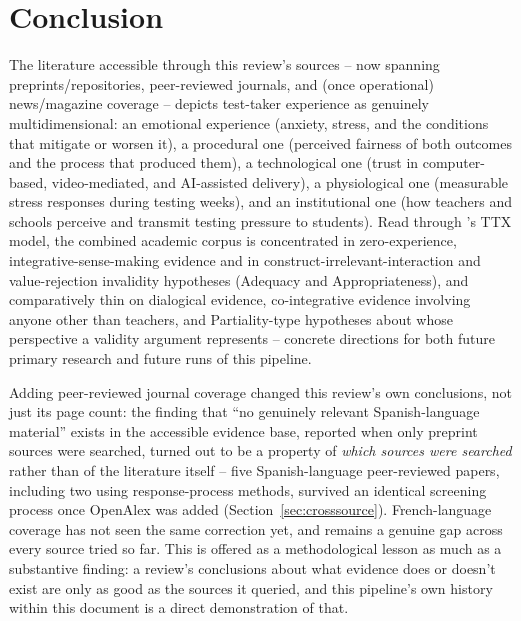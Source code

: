 \documentclass[11pt]{article}
\begin{document}
\section{Conclusion}

The literature accessible through this review's sources -- now spanning preprints/repositories, peer-reviewed journals, and (once operational) news/magazine coverage -- depicts test-taker experience as genuinely multidimensional: an emotional experience (anxiety, stress, and the conditions that mitigate or worsen it), a procedural one (perceived fairness of both outcomes and the process that produced them), a technological one (trust in computer-based, video-mediated, and AI-assisted delivery), a physiological one (measurable stress responses during testing weeks), and an institutional one (how teachers and schools perceive and transmit testing pressure to students). Read through \citeauthor{araneda2025ttxmodel}'s TTX model, the combined academic corpus is concentrated in zero-experience, integrative-sense-making evidence and in construct-irrelevant-interaction and value-rejection invalidity hypotheses (Adequacy and Appropriateness), and comparatively thin on dialogical evidence, co-integrative evidence involving anyone other than teachers, and Partiality-type hypotheses about whose perspective a validity argument represents -- concrete directions for both future primary research and future runs of this pipeline.

Adding peer-reviewed journal coverage changed this review's own conclusions, not just its page count: the finding that ``no genuinely relevant Spanish-language material'' exists in the accessible evidence base, reported when only preprint sources were searched, turned out to be a property of \emph{which sources were searched} rather than of the literature itself -- five Spanish-language peer-reviewed papers, including two using response-process methods, survived an identical screening process once OpenAlex was added (Section~\ref{sec:crosssource}). French-language coverage has not seen the same correction yet, and remains a genuine gap across every source tried so far. This is offered as a methodological lesson as much as a substantive finding: a review's conclusions about what evidence does or doesn't exist are only as good as the sources it queried, and this pipeline's own history within this document is a direct demonstration of that.
\end{document}
